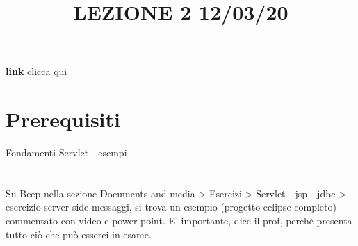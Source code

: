 \title{LEZIONE 2 12/03/20}\newline
\textbf{link} \href{https://web.microsoftstream.com/video/53d9a40e-3109-44fc-8195-0553eedfb6d9}{clicca qui}
\section*{Prerequisiti}
Fondamenti Servlet - esempi
\section{}
Su Beep nella sezione Documents and media > Esercizi > Servlet - jsp - jdbc > esercizio server side messaggi, si trova un esempio (progetto eclipse completo) commentato con video e power point. E' importante, dice il prof, perchè presenta tutto ciò che può esserci in esame.
